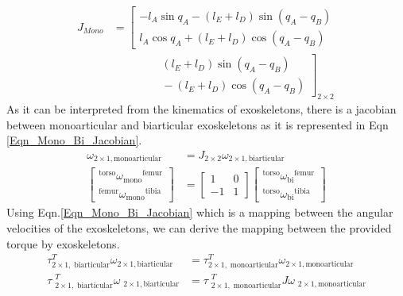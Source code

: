 \documentclass[10pt,letterpaper]{article}
\begin{document}
\begin{equation}\label{Eqn_Mono_Jacobian}
\begin{aligned}
J_{Mono}&=
\left[\begin{matrix}
-l_{A}\sin{q_{A}}- (l_ {E} + l_ {D})\sin (q_ {A} - q_ {B})\\
l_{A}\cos{q_{A}} + (l_{E} + l_{D})\cos (q_{A} - q_ {B})
\end{matrix}\right.\\
&\qquad\qquad
\left.\begin{matrix}
{} (l_ {E} + l_ {D})\sin (q_ {A} - q_ {B})\\
{} - (l_ {E} + l_ {D})\cos (q_ {A} - q_ {B})
\end{matrix}\right]_{2\times 2}
\end{aligned}
\end{equation}
As it can be interpreted from the kinematics of exoskeletons, there is a jacobian between monoarticular and biarticular exoskeletons as it is represented in Eqn \eqref{Eqn_Mono_Bi_Jacobian}.
\begin{equation}\label{Eqn_Mono_Bi_Jacobian}
\begin{aligned}
\omega_{2\times 1, \mathrm{monoarticular}} &= J_{2\times 2}\omega_{2\times 1, \mathrm{biarticular}}\\
\left\lbrack \begin{array}{c}
{}^{\mathrm{torso}} {\omega_{\mathrm{mono}} }^{\mathrm{femur}} \\
{}^{\mathrm{femur}} {\omega_{\mathrm{mono}} }^{\mathrm{tibia}} 
\end{array}\right\rbrack &=\left\lbrack \begin{array}{cc}
1 & 0\\
-1 & 1
\end{array}\right\rbrack \left\lbrack \begin{array}{c}
{}^{\mathrm{torso}} {\omega_{\mathrm{bi}} }^{\mathrm{femur}} \\
{}^{\mathrm{torso}} {\omega_{\mathrm{bi}} }^{\mathrm{tibia}} 
\end{array}\right\rbrack
\end{aligned}
\end{equation}
Using Eqn.\eqref{Eqn_Mono_Bi_Jacobian} which is a mapping between the angular velocities of the exoskeletons, we can derive the mapping between the provided torque by exoskeletons.
\begin{equation*}
\begin{aligned}
\tau{}_{2\times 1,\;\mathrm{biarticular}}^T \omega {}_{2\times 1,\mathrm{biarticular}} &=\tau {}_{2\times 1,\;\mathrm{monoarticular}}^T \omega {}_{2\times 1,\mathrm{monoarticular}}\\
\tau {\;}_{2\times 1,\;\mathrm{biarticular}}^T \omega {\;}_{2\times 1,\mathrm{biarticular}} &=\tau {\;}_{2\times 1,\;\mathrm{monoarticular}}^T J\omega {\;}_{2\times 1,\mathrm{monoarticular}}\\
\end{aligned}
\end{equation*}
\end{document}

